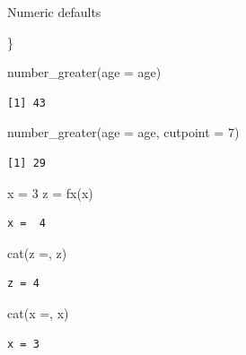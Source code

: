 \documentclass[
  ignorenonframetext,
]{beamer}
\newenvironment{Shaded}{\begin{snugshade}}{\end{snugshade}}
\newcommand{\AttributeTok}[1]{\textcolor[rgb]{0.40,0.45,0.13}{#1}}
\newcommand{\DecValTok}[1]{\textcolor[rgb]{0.68,0.00,0.00}{#1}}
\newcommand{\FunctionTok}[1]{\textcolor[rgb]{0.28,0.35,0.67}{#1}}
\newcommand{\NormalTok}[1]{\textcolor[rgb]{0.00,0.23,0.31}{#1}}
\newcommand{\OtherTok}[1]{\textcolor[rgb]{0.00,0.23,0.31}{#1}}
\newcommand{\StringTok}[1]{\textcolor[rgb]{0.13,0.47,0.30}{#1}}
\begin{document}
\begin{frame}[fragile]
\begin{block}{Numeric defaults}
\begin{Shaded}
\begin{Highlighting}[]
\NormalTok{\}}

\FunctionTok{number\_greater}\NormalTok{(}\AttributeTok{age =}\NormalTok{ age)}
\end{Highlighting}
\end{Shaded}

\begin{verbatim}
[1] 43
\end{verbatim}

\begin{Shaded}
\begin{Highlighting}[]
\FunctionTok{number\_greater}\NormalTok{(}\AttributeTok{age =}\NormalTok{ age, }\AttributeTok{cutpoint =} \DecValTok{7}\NormalTok{)}
\end{Highlighting}
\end{Shaded}

\begin{verbatim}
[1] 29
\end{verbatim}
\end{block}
\end{frame}

\begin{frame}[fragile]
\begin{Shaded}
\begin{Highlighting}[]
\NormalTok{x }\OtherTok{=} \DecValTok{3}
\NormalTok{z }\OtherTok{=} \FunctionTok{fx}\NormalTok{(x)}
\end{Highlighting}
\end{Shaded}

\begin{verbatim}
x =  4
\end{verbatim}

\begin{Shaded}
\begin{Highlighting}[]
\FunctionTok{cat}\NormalTok{(}\StringTok{\textquotesingle{}z =\textquotesingle{}}\NormalTok{, z)}
\end{Highlighting}
\end{Shaded}

\begin{verbatim}
z = 4
\end{verbatim}

\begin{Shaded}
\begin{Highlighting}[]
\FunctionTok{cat}\NormalTok{(}\StringTok{\textquotesingle{}x =\textquotesingle{}}\NormalTok{, x)}
\end{Highlighting}
\end{Shaded}

\begin{verbatim}
x = 3
\end{verbatim}
\end{frame}

\begin{frame}
\end{frame}
\end{document}
